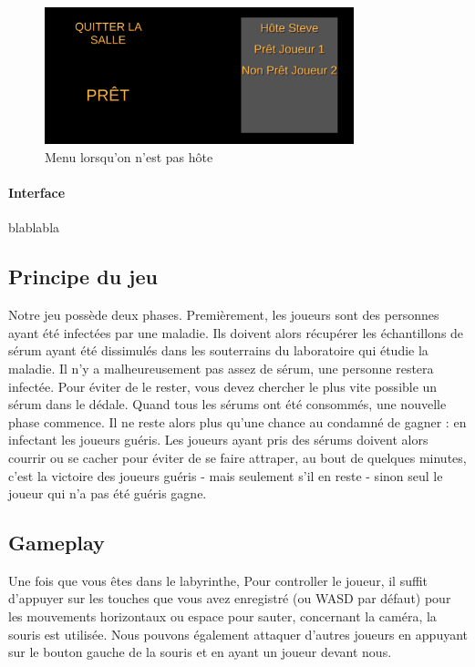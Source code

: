 \documentclass{article}
\begin{document}
\begin{figure}[!ht]
    \centering
    \includegraphics[width=0.8\textwidth]{Menu32.png}
    \caption{Menu lorsqu'on n'est pas hôte}
    \label{Menu lorsqu'on n'est pas hôte}
\end{figure}


\paragraph{Interface}
blablabla



\newpage
\subsection{Principe du jeu}

Notre jeu possède deux phases.
Premièrement, les joueurs sont des personnes ayant été infectées par une maladie. Ils doivent alors récupérer les échantillons de sérum ayant été dissimulés dans les souterrains du laboratoire qui étudie la maladie. Il n'y a malheureusement pas assez de sérum, une personne restera infectée. Pour éviter de le rester, vous devez chercher le plus vite possible un sérum dans le dédale.
Quand tous les sérums ont été consommés, une nouvelle phase commence. Il ne reste alors plus qu'une chance au condamné de gagner : en infectant les joueurs guéris. Les joueurs ayant pris des sérums doivent alors courrir ou se cacher pour éviter de se faire attraper, au bout de quelques minutes, c'est la victoire des joueurs guéris - mais seulement s'il en reste - sinon seul le joueur qui n'a pas été guéris gagne.


\subsection{Gameplay}

Une fois que vous êtes dans le labyrinthe,
Pour controller le joueur, il suffit d'appuyer sur les touches que vous avez enregistré (ou WASD par défaut) pour les mouvements horizontaux ou espace pour sauter, concernant la caméra, la souris est utilisée. Nous pouvons également attaquer d'autres joueurs en appuyant sur le bouton gauche de la souris et en ayant un joueur devant nous.
\end{document}
